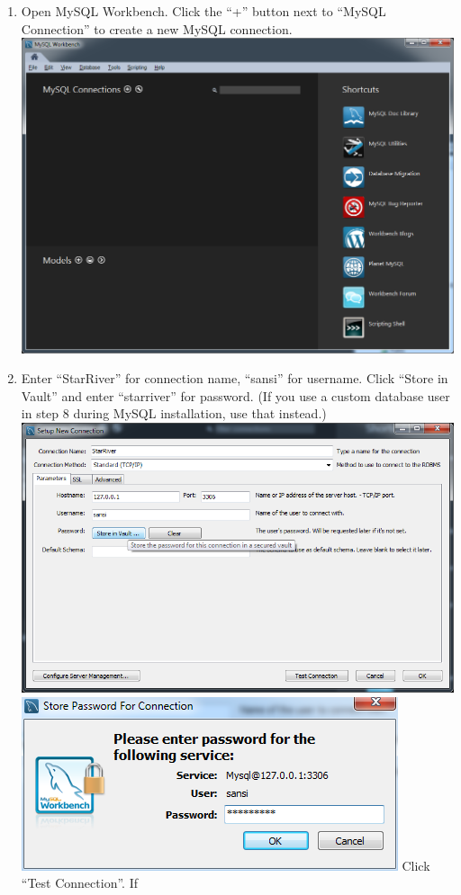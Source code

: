 \begin{enumerate}
\def\labelenumi{\arabic{enumi}.}
\itemsep1pt\parskip0pt
\item
  Open MySQL Workbench. Click the ``+'' button next to ``MySQL
  Connection'' to create a new MySQL connection.
  \includegraphics{img/db_init_1.png}
\item
  Enter ``StarRiver'' for connection name, ``sansi'' for username. Click
  ``Store in Vault'' and enter ``starriver'' for password. (If you use a
  custom database user in step 8 during MySQL installation, use that
  instead.) \includegraphics{img/db_init_2.png}
  \includegraphics{img/db_init_3.png} Click ``Test Connection''. If

\end{enumerate}
